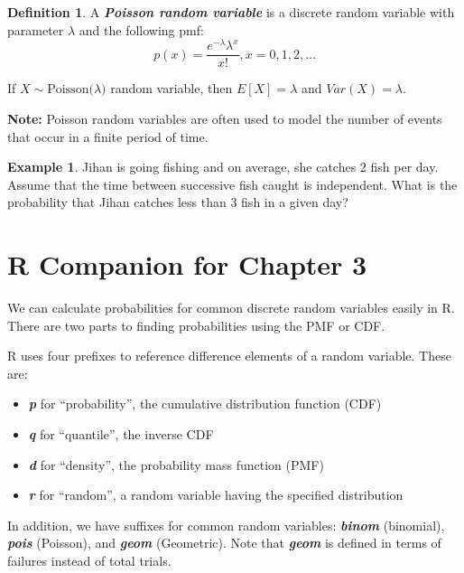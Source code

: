 \documentclass[
  11pt,
  oneside]{book}
\theoremstyle{definition}
\newtheorem{definition}{Definition}[chapter]
\theoremstyle{definition}
\newtheorem{example}{Example}[chapter]
\theoremstyle{definition}
\theoremstyle{definition}
\theoremstyle{remark}
\begin{document}
\begin{definition}
A \textbf{\emph{Poisson random variable}} is a discrete random variable with parameter \(\lambda\) and the following pmf: \[p(x)=\frac{e^{-\lambda} \lambda^x}{x!}, x = 0, 1, 2, \ldots \]

If \(X \sim \text{Poisson(}\lambda)\) random variable, then \(E[X] = \lambda\) and \(Var(X) = \lambda\).
\end{definition}

\textbf{Note:} Poisson random variables are often used to model the number of events that occur in a finite period of time.

\begin{example}
Jihan is going fishing and on average, she catches 2 fish per day. Assume that the time between successive fish caught is independent. What is the probability that Jihan catches less than 3 fish in a given day?
\end{example}

\vfill

\newpage

\section{R Companion for Chapter 3}\label{r-companion-for-chapter-3}

We can calculate probabilities for common discrete random variables easily in R. There are two parts to finding probabilities using the PMF or CDF.

R uses four prefixes to reference difference elements of a random variable. These are:

\begin{itemize}
\item
  \textbf{\emph{p}} for ``probability'', the cumulative distribution function (CDF)
\item
  \textbf{\emph{q}} for ``quantile'', the inverse CDF
\item
  \textbf{\emph{d}} for ``density'', the probability mass function (PMF)
\item
  \textbf{\emph{r}} for ``random'', a random variable having the specified distribution
\end{itemize}

In addition, we have suffixes for common random variables: \textbf{\emph{binom}} (binomial), \textbf{\emph{pois}} (Poisson), and \textbf{\emph{geom}} (Geometric). Note that \textbf{\emph{geom}} is defined in terms of failures instead of total trials.
\end{document}
